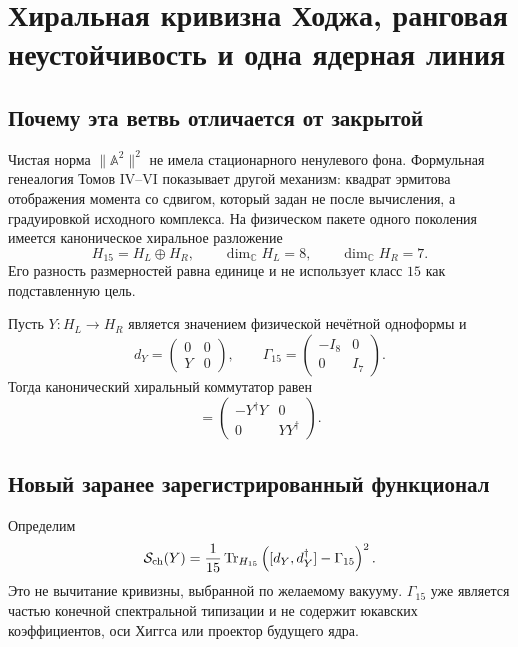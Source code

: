 \chapter{Хиральная кривизна Ходжа, ранговая неустойчивость и одна ядерная линия}

\section{Почему эта ветвь отличается от закрытой}

Чистая норма $\|\mathbb A^2\|^2$ не имела стационарного ненулевого фона.
Формульная генеалогия Томов IV--VI показывает другой механизм: квадрат
эрмитова отображения момента со сдвигом, который задан не после вычисления,
а градуировкой исходного комплекса. На физическом пакете одного поколения
имеется каноническое хиральное разложение
\begin{equation}
 H_{15}=H_L\oplus H_R,
 \qquad
 \dim_{\mathbb C}H_L=8,
 \qquad
 \dim_{\mathbb C}H_R=7.
 \label{eq:v7-h15-chiral-dimensions}
\end{equation}
Его разность размерностей равна единице и не использует класс $15$ как
подставленную цель.

Пусть $Y:H_L\to H_R$ является значением физической нечётной одноформы и
\begin{equation}
 d_Y=
 \begin{pmatrix}0&0\\Y&0\end{pmatrix},
 \qquad
 \Gamma_{15}=
 \begin{pmatrix}-I_8&0\\0&I_7\end{pmatrix}.
\end{equation}
Тогда канонический хиральный коммутатор равен
\begin{equation}
 [d_Y,d_Y^\dagger]
 =\begin{pmatrix}-Y^\dagger Y&0\\0&YY^\dagger\end{pmatrix}.
\end{equation}

\section{Новый заранее зарегистрированный функционал}

Определим
\begin{equation}
 \mathcal S_{\rm ch}(Y)
 =\frac1{15}\operatorname{Tr}_{H_{15}}
 \left([d_Y,d_Y^\dagger]-\Gamma_{15}\right)^2.
 \label{eq:v7-chiral-hodge-parent}
\end{equation}
Это не вычитание кривизны, выбранной по желаемому вакууму.
$\Gamma_{15}$ уже является частью конечной спектральной типизации и не
содержит юкавских коэффициентов, оси Хиггса или проектор будущего ядра.

